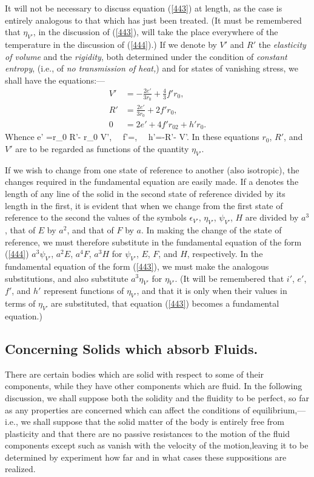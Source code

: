 \documentclass[12pt]{article}
\begin{document}
{It will not be necessary to discuss equation (\ref{443}) at length, as the case is entirely analogous to that which has just been treated. (It must be remembered that $\eta_{V'}$, in the discussion of (\ref{443}), will take the place everywhere of the temperature in the discussion of (\ref{444}).) If we denote by $V'$ and $R'$ the \textit{elasticity of volume} and the \textit{rigidity}, both determined under the condition of \textit{constant entropy}, (i.e., of \textit{no transmission of heat,}) and for states of vanishing stress, we shall have the equations:---
\begin{align} V' &= -\frac{2e'}{3r_0}+\frac{4}{3}f'r_0 ,\label{458} \\
 R' &= \frac{2e'}{3r_0} +2f'r_0,   \label{459} \\
 0 &= 2e' + 4f'r_02 + h'r_0. \label{460}\end{align}
Whence
\eqs e' =r_0 R'- r_0 V', \ \ f'=, \ \ h'=-R'- V'. \label{461}\eqe
In these equations $r_0$, $R'$, and $V'$ are to be regarded as functions of the quantity $\eta_{V'}$.


If we wish to change from one state of reference to another (also isotropic), the changes required in the fundamental equation are easily made. If a denotes the length of any line of the solid in the second state of reference divided by its length in the first, it is evident that when we change from the first state of reference to the second the values of the symbols $\epsilon_{V'}$, $\eta_{V'}$, $\psi_{V'}$, $H$ are divided by $a^3$, that of $E$ by $a^2$, and that of $F$ by $a$. In making the change of the state of reference, we must therefore substitute in the fundamental equation of the form  (\ref{444}) $a^3 \psi_{V'}$, $a^2E$, $a^4F$, $a^3H$ for $\psi_{V'}$, $E$, $F$, and $H$, respectively. In the fundamental equation of the form (\ref{443}), we must make the analogous substitutions, and also substitute $a^3\eta_{V'}$ for $\eta_{V'}$. (It will be remembered that $i'$, $e'$, $f'$, and $h'$ represent functions of $\eta_{V'}$, and that it is only when their values in terms of $\eta_{V'}$ are substituted, that equation (\ref{443}) becomes a fundamental equation.)

\subsection{Concerning Solids which absorb Fluids.}
There are certain bodies which are solid with respect to some of their components, while they have other components which are fluid. In the following discussion, we shall suppose both the solidity and the fluidity to be perfect, so far as any properties are concerned which can affect the conditions of equilibrium,---i.e., we shall suppose that the solid matter of the body is entirely free from plasticity and that there are no passive resistances to the motion of the fluid components except such as vanish with the velocity of the motion,leaving it to be determined by experiment how far and in what cases these suppositions are realized.


}
\end{document}
